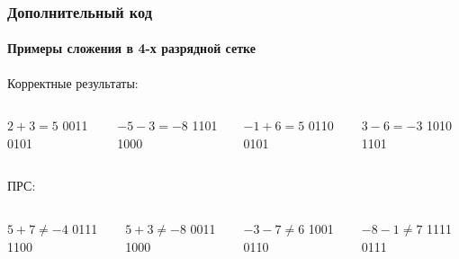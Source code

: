 \begin{frame}
    \frametitle{Дополнительный код}
    \framesubtitle{Примеры сложения в 4-х разрядной сетке}
    
    Корректные результаты:
    \begin{columns}
            \begin{block}{$2+3=5$}
                 \center
                          {0011}
                          {0101}
            \end{block}
            \begin{block}{${-5}-3=-8$}
                 \center
                          {1101}
                          {1000}
            \end{block}
            \begin{block}{${-1}+6=5$}
                 \center
                          {0110}
                          {0101}
            \end{block}
            \begin{block}{$3-6={-3}$}
                 \center
                          {1010}
                          {1101}
            \end{block}
    \end{columns}

    ПРС:
    \begin{columns}
            \begin{block}{$5+7\neq -4$}
                 \center
                          {0111}
                          {1100}
            \end{block}
            \begin{block}{$5+3\neq -8$}
                 \center
                          {0011}
                          {1000}
            \end{block}
            \begin{block}{$-3-7\neq 6$}
                 \center
                          {1001}
                          {0110}
            \end{block}
            \begin{block}{$-8-1\neq 7$}
                 \center
                          {1111}
                          {0111}
            \end{block}
    \end{columns}
\end{frame}

